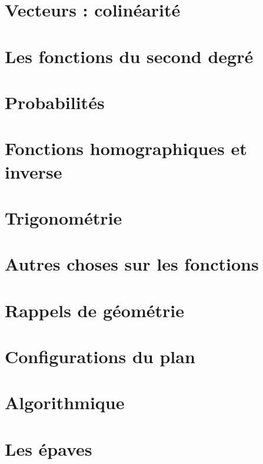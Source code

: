 \documentclass[a4paper,12pt]{book}
\begin{document}
\chapter{Vecteurs : colinéarité}


\chapter{Les fonctions du second degré}


\chapter{Probabilités}


\chapter{Fonctions homographiques et inverse}


\chapter{Trigonométrie}



\chapter{Autres choses sur les fonctions}


\chapter{Rappels de géométrie}


\chapter{Configurations du plan}


\chapter{Algorithmique}


\chapter{Les épaves}

\end{document}
